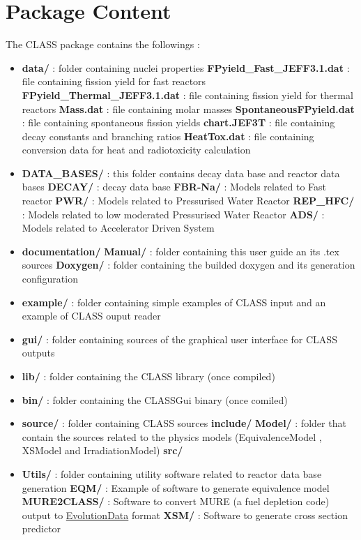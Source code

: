 \chapter{Package Content}
The CLASS package contains the followings :
\begin{itemize}
\item   \textbf{data/} : folder containing nuclei properties
\subitem \textbf{FPyield\_Fast\_JEFF3.1.dat }     : file containing fission yield for fast reactors
\subitem \textbf{FPyield\_Thermal\_JEFF3.1.dat}   : file containing fission yield for thermal reactors
\subitem \textbf{Mass.dat }                     : file containing molar masses
\subitem \textbf{SpontaneousFPyield.dat }       : file containing spontaneous fission yields
\subitem \textbf{chart.JEF3T}                   : file containing decay constants and branching ratios
\subitem \textbf{HeatTox.dat}                   : file containing conversion data for heat and radiotoxicity calculation

 \item \textbf{DATA\_BASES/}  : this folder contains decay data base and reactor data bases
 \subitem \textbf{DECAY/}     : decay data base
 \subitem \textbf{FBR-Na/}    : Models related to Fast reactor
 \subitem \textbf{PWR/}       : Models related to Pressurised Water Reactor
 \subitem \textbf{REP_HFC/}   : Models related to low moderated Pressurised Water Reactor 
 \subitem \textbf{ADS/}       : Models related to Accelerator Driven System
 
 \item \textbf{documentation/} 
 \subitem \textbf{Manual/}    : folder containing this user guide an its .tex sources
 \subitem \textbf{Doxygen/}   : folder containing the builded doxygen and its generation configuration 

\item \textbf{example/} : folder containing simple examples of CLASS input and an example of CLASS ouput reader

\item \textbf{gui/} : folder containing sources of the graphical user interface for CLASS outputs
 

\item \textbf{lib/} : folder containing the CLASS library (once compiled)

\item \textbf{bin/} : folder containing the CLASSGui binary (once comiled)

\item \textbf{source/} : folder containing CLASS sources
\subitem \textbf{include/}
\subitem \textbf{Model/} : folder that contain the sources related to the physics models (EquivalenceModel , XSModel and IrradiationModel)
\subitem \textbf{src/}
\item \textbf{Utils/} : folder containing utility software related to reactor data base generation
\subitem \textbf{EQM/} : Example of software to generate equivalence model
\subitem \textbf{MURE2CLASS/} : Software to convert MURE (a fuel depletion code)  output to \hyperref[sec:EvolutionData]{EvolutionData} format
\subitem \textbf{XSM/} : Software to generate cross section predictor
 
 
\end{itemize}

